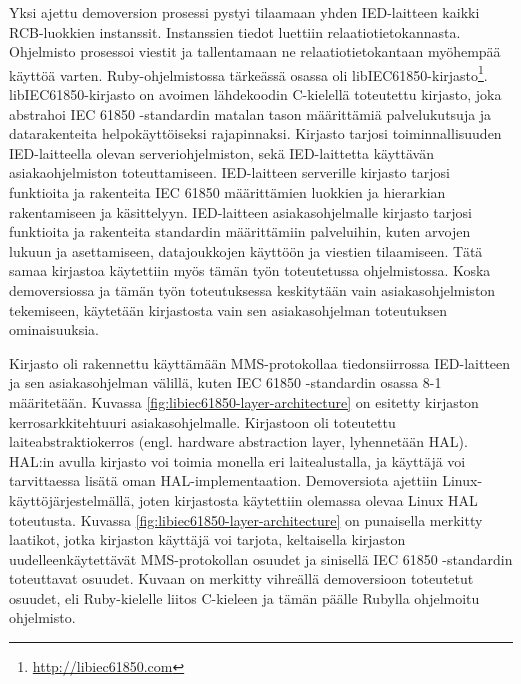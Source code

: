 Yksi ajettu demoversion prosessi pystyi tilaamaan yhden IED-laitteen kaikki RCB-luokkien instanssit. Instanssien tiedot luettiin relaatiotietokannasta. Ohjelmisto prosessoi viestit ja tallentamaan ne relaatiotietokantaan myöhempää käyttöä varten. Ruby-ohjelmistossa tärkeässä osassa oli libIEC61850-kirjasto\footnote{\url{http://libiec61850.com}}. libIEC61850-kirjasto on avoimen lähdekoodin C-kielellä toteutettu kirjasto, joka abstrahoi IEC 61850 -standardin matalan tason määrittämiä palvelukutsuja ja datarakenteita helpokäyttöiseksi rajapinnaksi. Kirjasto tarjosi toiminnallisuuden IED-laitteella olevan serveriohjelmiston, sekä IED-laittetta käyttävän asiakaohjelmiston toteuttamiseen. IED-laitteen serverille kirjasto tarjosi funktioita ja rakenteita IEC 61850 määrittämien luokkien ja hierarkian rakentamiseen ja käsittelyyn. IED-laitteen asiakasohjelmalle kirjasto tarjosi funktioita ja rakenteita standardin määrittämiin palveluihin, kuten arvojen lukuun ja asettamiseen, datajoukkojen käyttöön ja viestien tilaamiseen. Tätä samaa kirjastoa käytettiin myös tämän työn toteutetussa ohjelmistossa. Koska demoversiossa ja tämän työn toteutuksessa keskitytään vain asiakasohjelmiston tekemiseen, käytetään kirjastosta vain sen asiakasohjelman toteutuksen ominaisuuksia.

Kirjasto oli rakennettu käyttämään MMS-protokollaa tiedonsiirrossa IED-laitteen ja sen asiakasohjelman välillä, kuten IEC 61850 -standardin osassa 8-1 määritetään. Kuvassa \ref{fig:libiec61850-layer-architecture} on esitetty kirjaston kerrosarkkitehtuuri asiakasohjelmalle. Kirjastoon oli toteutettu laiteabstraktiokerros (engl. hardware abstraction layer, lyhennetään HAL). HAL:in avulla kirjasto voi toimia monella eri laitealustalla, ja käyttäjä voi tarvittaessa lisätä oman HAL-implementaation. Demoversiota ajettiin Linux-käyttöjärjestelmällä, joten kirjastosta käytettiin olemassa olevaa Linux HAL toteutusta. Kuvassa \ref{fig:libiec61850-layer-architecture} on punaisella merkitty laatikot, jotka kirjaston käyttäjä voi tarjota, keltaisella kirjaston uudelleenkäytettävät MMS-protokollan osuudet ja sinisellä IEC 61850 -standardin toteuttavat osuudet. Kuvaan on merkitty vihreällä demoversioon toteutetut osuudet, eli Ruby-kielelle liitos C-kieleen ja tämän päälle Rubylla ohjelmoitu ohjelmisto.

